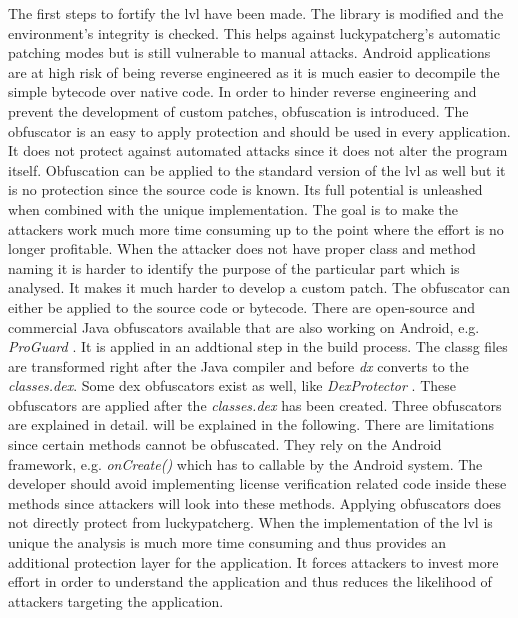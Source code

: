 The first steps to fortify the \gls{lvl} have been made.
The library is modified and the environment's integrity is checked.
This helps against \gls{luckypatcherg}'s automatic patching modes but is still vulnerable to manual attacks.
Android applications are at high risk of being reverse engineered as it is much easier to decompile the simple bytecode over native code.
In order to hinder reverse engineering and prevent the development of custom patches, obfuscation is introduced.
\newline
The obfuscator is an easy to apply protection and should be used in every application.
It does not protect against automated attacks since it does not alter the program itself.
Obfuscation can be applied to the standard version of the \gls{lvl} as well but it is no protection since the source code is known.
Its full potential is unleashed when combined with the unique implementation.
The goal is to make the attackers work much more time consuming up to the point where the effort is no longer profitable.
When the attacker does not have proper class and method naming it is harder to identify the purpose of the particular part which is analysed.
It makes it much harder to develop a custom patch. \cite{developersSecuring}
\newline
The obfuscator can either be applied to the source code or bytecode.
There are open-source and commercial Java obfuscators available that are also working on Android, e.g. \textit{ProGuard} \cite{proguard}.
It is applied in an addtional step in the build process.
The \gls{classg} files are transformed right after the Java compiler and before \textit{dx} converts to the \textit{classes.dex}. \cite{proguard} \cite{androidProguard}
Some dex obfuscators exist as well, like \textit{DexProtector} \cite{dexProtector}.
These obfuscators are applied after the \textit{classes.dex} has been created.
\newline
Three obfuscators are explained in detail. will be explained in the following. \cite{developersSecuring}
\newline
\newline
There are limitations since certain methods cannot be obfuscated.
They rely on the Android framework, e.g. \textit{onCreate()} which has to callable by the Android system.
The developer should avoid implementing license verification related code inside these methods since attackers will look into these methods.
\cite{developersSecuring}
\newline
\newline
Applying obfuscators does not directly protect from \gls{luckypatcherg}.
When the implementation of the \gls{lvl} is unique the analysis is much more time consuming and thus provides an additional protection layer for the application.
It forces attackers to invest more effort in order to understand the application and thus reduces the likelihood of attackers targeting the application.
